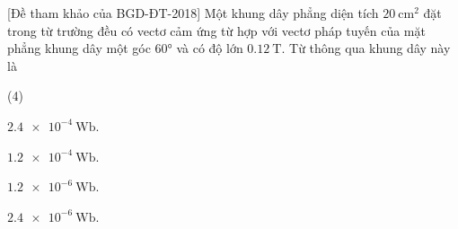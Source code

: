 \begin{enumerate}[label=\bfseries Câu \arabic*:]
{		[Đề tham khảo của BGD-ĐT-2018] Một khung dây phẳng diện tích $\SI{20}{\centi \meter \squared}$ đặt trong từ trường đều có vectơ cảm ứng từ hợp với vectơ pháp tuyến của mặt phẳng khung dây một góc $\ang{60}$ và có độ lớn $\SI{0.12}{\tesla}$. Từ thông qua khung dây này là
	}
	

\end{enumerate}
